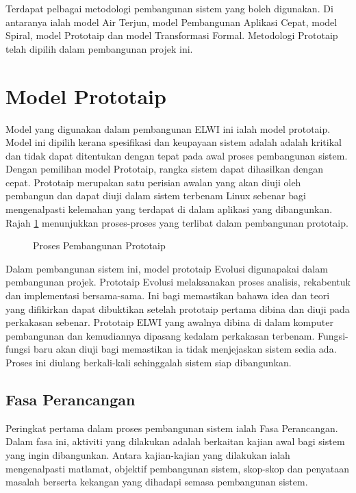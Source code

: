 Terdapat pelbagai metodologi pembangunan sistem yang boleh digunakan. Di antaranya ialah model Air Terjun, model Pembangunan Aplikasi Cepat, model Spiral, model Prototaip dan model Transformasi Formal. Metodologi Prototaip telah dipilih dalam pembangunan projek ini.

\section{Model Prototaip}
Model yang digunakan dalam pembangunan ELWI ini ialah model prototaip. Model ini dipilih kerana spesifikasi dan keupayaan sistem adalah adalah kritikal dan tidak dapat ditentukan dengan tepat pada awal proses pembangunan sistem. Dengan pemilihan model Prototaip, rangka sistem dapat dihasilkan dengan cepat. Prototaip merupakan satu perisian awalan yang akan diuji oleh pembangun dan dapat diuji dalam sistem terbenam Linux sebenar bagi mengenalpasti kelemahan yang terdapat di dalam aplikasi yang dibangunkan. Rajah \ref{c3:f1} menunjukkan proses-proses yang terlibat dalam pembangunan prototaip.

\begin{figure}[!h]
\caption[Proses Pembangunan Prototaip]{Proses Pembangunan Prototaip}
\label{c3:f1}
\end{figure}

Dalam pembangunan sistem ini, model prototaip Evolusi digunapakai dalam pembangunan projek. Prototaip Evolusi melaksanakan proses analisis, rekabentuk dan implementasi bersama-sama. Ini bagi memastikan bahawa idea dan teori yang difikirkan dapat dibuktikan setelah prototaip pertama dibina dan diuji pada perkakasan sebenar. Prototaip ELWI yang awalnya dibina di dalam komputer pembangunan dan kemudiannya dipasang kedalam perkakasan terbenam. Fungsi-fungsi baru akan diuji bagi memastikan ia tidak menjejaskan sistem sedia ada. Proses ini diulang berkali-kali sehinggalah sistem siap dibangunkan.

\subsection{Fasa Perancangan}
Peringkat pertama dalam proses pembangunan sistem ialah Fasa Perancangan. Dalam fasa ini, aktiviti yang dilakukan adalah berkaitan kajian awal bagi sistem yang ingin dibangunkan. Antara kajian-kajian yang dilakukan ialah mengenalpasti matlamat, objektif pembangunan sistem, skop-skop dan penyataan masalah berserta kekangan yang dihadapi semasa pembangunan sistem. 

